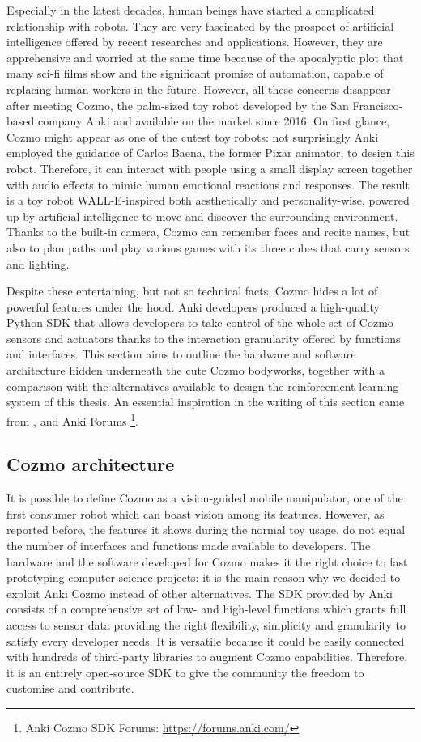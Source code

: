 Especially in the latest decades, human beings have started a complicated relationship with robots.
They are very fascinated by the prospect of artificial intelligence offered by recent researches and applications.
However, they are apprehensive and worried at the same time because of the apocalyptic plot that many sci-fi films show and the significant promise of automation, capable of replacing human workers in the future.
However, all these concerns disappear after meeting Cozmo, the palm-sized toy robot developed by the San Francisco-based company Anki and available on the market since 2016.
On first glance, Cozmo might appear as one of the cutest toy robots: not surprisingly Anki employed the guidance of Carlos Baena, the former Pixar animator, to design this robot.
Therefore, it can interact with people using a small display screen together with audio effects to mimic human emotional reactions and responses.
The result is a toy robot WALL-E-inspired both aesthetically and personality-wise, powered up by artificial intelligence to move and discover the surrounding environment.
Thanks to the built-in camera, Cozmo can remember faces and recite names, but also to plan paths and play various games with its three cubes that carry sensors and lighting.

Despite these entertaining, but not so technical facts, Cozmo hides a lot of powerful features under the hood.
Anki developers produced a high-quality Python SDK that allows developers to take control of the whole set of Cozmo sensors and actuators thanks to the interaction granularity offered by functions and interfaces.
This section aims to outline the hardware and software architecture hidden underneath the cute Cozmo bodyworks, together with a comparison with the alternatives available to design the reinforcement learning system of this thesis.
An essential inspiration in the writing of this section came from \cite{mellon2017cognitive}, \cite{touretzky2018cozmopedia} and Anki Forums \footnote{Anki Cozmo SDK Forums: \href{https://forums.anki.com/}{https://forums.anki.com/}}.

\subsection{Cozmo architecture}

It is possible to define Cozmo as a vision-guided mobile manipulator, one of the first consumer robot which can boast vision among its features.
However, as reported before, the features it shows during the normal toy usage, do not equal the number of interfaces and functions made available to developers.
The hardware and the software developed for Cozmo makes it the right choice to fast prototyping computer science projects: it is the main reason why we decided to exploit Anki Cozmo instead of other alternatives.
The SDK provided by Anki consists of a comprehensive set of low- and high-level functions which grants full access to sensor data providing the right flexibility, simplicity and granularity to satisfy every developer needs.
It is versatile because it could be easily connected with hundreds of third-party libraries to augment Cozmo capabilities.
Therefore, it is an entirely open-source SDK to give the community the freedom to customise and contribute.

